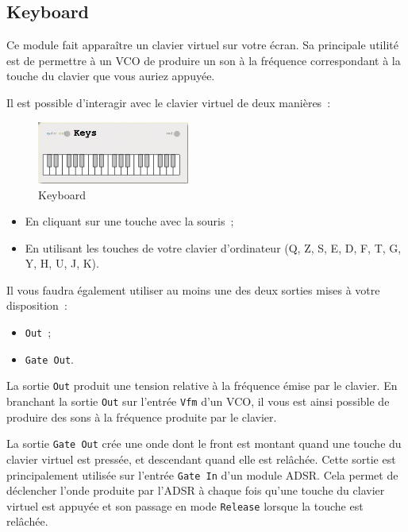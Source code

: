\documentclass[a4paper,oneside,frenchb,10pt]{article}
\begin{document}
\subsection{Keyboard}

\begin{multicols}{2}
Ce module fait apparaître un clavier virtuel sur votre écran. Sa
principale utilité est de permettre à un VCO de produire un son à la
fréquence correspondant à la touche du clavier que vous auriez appuyée.

Il est possible d'interagir avec le clavier virtuel de deux manières~:

\begin{figure}[H]
\centering
\includegraphics[width=5cm]{../img/png/keyboard.png}
\caption{Keyboard}
\end{figure}
\end{multicols}

\begin{itemize}
\item
  En cliquant sur une touche avec la souris~;
\item
  En utilisant les touches de votre clavier d'ordinateur (Q, Z, S, E, D,
  F, T, G, Y, H, U, J, K).
\end{itemize}
Il vous faudra également utiliser au moins une des deux sorties mises à
votre disposition~:

\begin{itemize}
\item
  \verb!Out!~;
\item
  \verb!Gate Out!.
\end{itemize}
La sortie \verb!Out! produit une tension relative à la fréquence émise
par le clavier. En branchant la sortie \verb!Out! sur l'entrée
\verb!Vfm! d'un VCO, il vous est ainsi possible de produire des sons à
la fréquence produite par le clavier.

La sortie \verb!Gate Out! crée une onde dont le front est montant quand
une touche du clavier virtuel est pressée, et descendant quand elle est
relâchée. Cette sortie est principalement utilisée sur l'entrée
\verb!Gate In! d'un module ADSR. Cela permet de déclencher l'onde
produite par l'ADSR à chaque fois qu'une touche du clavier virtuel est
appuyée et son passage en mode \verb!Release! lorsque la touche est
relâchée.
\end{document}
